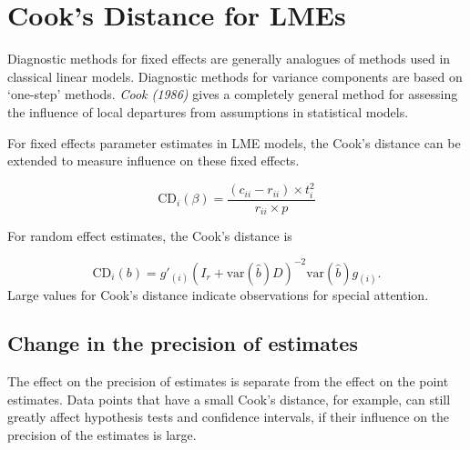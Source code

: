 \documentclass[00-ResidualsMain.tex]{subfiles}
\begin{document}
\newpage
\section{Cook's Distance for LMEs} %
Diagnostic methods for fixed effects are generally analogues of methods used in classical linear models.
Diagnostic methods for variance components are based on `one-step' methods.
\textit{Cook (1986)} gives a completely general method for assessing the influence of local departures from assumptions in statistical models.

For fixed effects parameter estimates in LME models, the  Cook's distance can be extended to measure influence on these fixed effects.

\[
\mbox{CD}_{i}(\beta) = \frac{(c_{ii} - r_{ii}) \times t^2_{i}}{r_{ii} \times p}
\]

For random effect estimates, the  Cook's distance is

\[
\mbox{CD}_{i}(b) = g{\prime}_{(i)} (I_{r} + \mbox{var}(\hat{b})D)^{-2}\mbox{var}(\hat{b})g_{(i)}.
\]
Large values for Cook's distance indicate observations for special attention.

\subsection{Change in the precision of estimates}

The effect on the precision of estimates is separate from the effect on the point estimates. Data points that
have a small Cook's distance, for example, can still greatly affect hypothesis tests and confidence intervals, if their  influence on the precision of the estimates is large.


\end{document}
